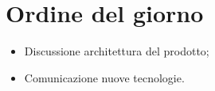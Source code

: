 \section{Ordine del giorno}

\begin{itemize}
\item Discussione architettura del prodotto;
\item Comunicazione nuove tecnologie.
\end{itemize}